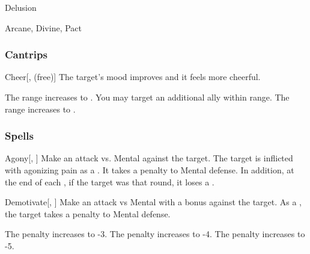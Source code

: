 \newpage
\begin{spellsection}{Delusion}

\begin{spellheader}
\end{spellheader}


 Arcane, Divine, Pact

\subsubsection{Cantrips}


\begin{freeability}{Cheer}[,  (free)]
The target's mood improves and it feels more cheerful.

\rankline
{} The range increases to \rngmed.
 You may target an additional ally within range.
 The range increases to \rnglong.
\end{freeability}

\end{spellsection}


\subsubsection{Spells}


\lowercase{\hypertarget{spell:Agony}{}}\label{spell:Agony}
\begin{freeability}[Rank 1]{\hypertarget{spell:Agony}{Agony}}[, ]
Make an attack vs. Mental against the target.
\hit The target is inflicted with agonizing pain as a .
It takes a  penalty to Mental defense.
In addition, at the end of each , if the target was  that round, it loses a .
\end{freeability}
\vspace{0.25em}



\lowercase{\hypertarget{spell:Demotivate}{}}\label{spell:Demotivate}
\begin{freeability}[Rank 1]{\hypertarget{spell:Demotivate}{Demotivate}}[, ]
Make an attack vs Mental with a  bonus against the target.
\hit As a , the target takes a  penalty to Mental defense.

\rankline
{} The penalty increases to -3.
 The penalty increases to -4.
 The penalty increases to -5.
\end{freeability}
\vspace{0.25em}




